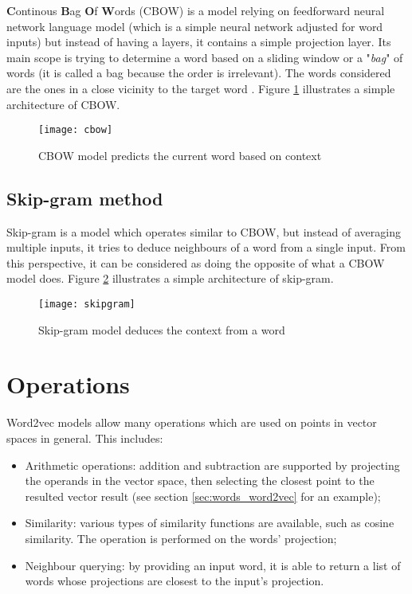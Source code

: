 \textbf{C}ontinous \textbf{B}ag \textbf{O}f \textbf{W}ords (CBOW) is a model relying on feedforward neural network language model (which is a simple neural network adjusted for word inputs) but instead of having a layers, it contains a simple projection layer. Its main scope is trying to determine a word based on a sliding window or a "\textit{bag}" of words (it is called a bag because the order is irrelevant). The words considered are the ones in a close vicinity to the target word \cite{word2vec}. Figure \ref{fig:cbow} illustrates a simple architecture of CBOW.

\begin{figure}[b!]
\centering
\texttt{[image: cbow]}
\caption{CBOW model predicts the current word based on context}
\label{fig:cbow}
\end{figure}

\subsection{Skip-gram method}
\label{subsec:words_creation_skipgram}

Skip-gram is a model which operates similar to CBOW, but instead of averaging multiple inputs, it tries to deduce neighbours of a word from a single input. From this perspective, it can be considered as doing the opposite of what a CBOW model does. Figure \ref{fig:skipgram} illustrates a simple architecture of skip-gram.

\begin{figure}[b!]
\centering
\texttt{[image: skipgram]}
\caption{Skip-gram model deduces the context from a word}
\label{fig:skipgram}
\end{figure}

\section{Operations}
\label{sec:words_operations}

Word2vec models allow many operations which are used on points in vector spaces in general. This includes:

\begin{itemize}
\item{Arithmetic operations: addition and subtraction are supported by projecting the operands in the vector space, then selecting the closest point to the resulted vector result (see section \ref{sec:words_word2vec} for an example);}
\item{Similarity: various types of similarity functions are available, such as cosine similarity. The operation is performed on the words' projection;}
\item{Neighbour querying: by providing an input word, it is able to return a list of words whose projections are closest to the input's projection.}
\end{itemize}




